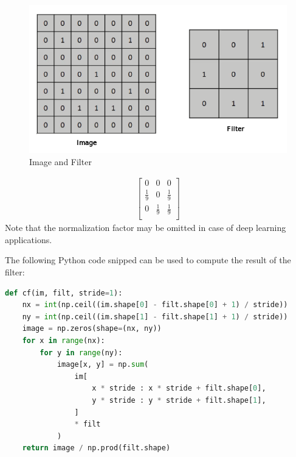\documentclass[a4paper]{article}
\begin{document}
\begin{figure}[ht]
  \centering
  \includegraphics[scale=0.4]{Reports/Images/q2.png}
  \caption{Image and Filter}
  \label{fig:q2}
\end{figure}

\begin{align}
\begin{bmatrix}
     0              & 0             & 0             \\
     \frac{1}{9}    & 0             & \frac{1}{9}   \\
     0              & \frac{1}{9}   & \frac{1}{9}   \\
 \end{bmatrix}
 \label{mat:ans}
\end{align}
Note that the normalization factor may be omitted in case of deep learning applications.

The following Python code snipped can be used to compute the result of the filter:

\begin{lstlisting}[language=Python]
def cf(im, filt, stride=1):
    nx = int(np.ceil((im.shape[0] - filt.shape[0] + 1) / stride))
    ny = int(np.ceil((im.shape[1] - filt.shape[1] + 1) / stride))
    image = np.zeros(shape=(nx, ny))
    for x in range(nx):
        for y in range(ny):
            image[x, y] = np.sum(
                im[
                    x * stride : x * stride + filt.shape[0],
                    y * stride : y * stride + filt.shape[1],
                ]
                * filt
            )
    return image / np.prod(filt.shape)
\end{lstlisting}
\end{document}
